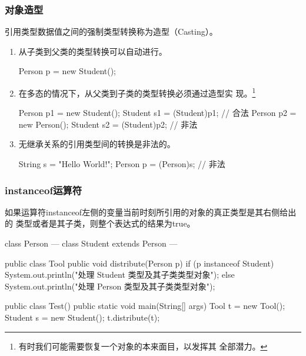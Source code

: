 \begin{frame}[fragile] %
\frametitle{对象造型}

引用类型数据值之间的强制类型转换称为{\hei\Mage 造型（Casting）}。

\begin{enumerate}[<+-| structure@+>]
\item 从子类到父类的类型转换可以自动进行。
  \begin{javaCode}
    Person p = new Student();    
  \end{javaCode}
\item 在多态的情况下，从父类到子类的类型转换必须通过造型实
  现。\footnote{{\kai 有时我们可能需要恢复一个对象的本来面目，以发挥其
      全部潜力。}}
  \begin{javaCode}
    Person p1 = new Student();  
    Student s1 = (Student)p1;   // 合法
    Person p2 = new Person();   
    Student s2 = (Student)p2;  // 非法  
  \end{javaCode}
\item 无继承关系的引用类型间的转换是非法的。
  \begin{javaCode}
    String s = "Hello World!";
    Person p = (Person)s; // 非法  
  \end{javaCode}
\end{enumerate}
\end{frame}

\begin{frame}[fragile] %
\frametitle{instanceof运算符}

{\footnotesize 如果运算符instanceof左侧的变量当前时刻所引用的对象的{\hei\Red 真正类型}是其右侧给出的
  类型{\Blue 或者是其子类}，则整个表达式的结果为true。}

\pause

\begin{javaCode}
class Person { --- }
class Student extends Person { --- }

public class Tool {
  public void distribute(Person p) {
    if (p instanceof Student) {
      System.out.println("处理 Student 类型及其子类类型对象");
    } else {
      System.out.println("处理 Person 类型及其子类类型对象");
    }
  }
}
\end{javaCode}

\begin{javaCode}
public class Test() {
  public static void main(String[] args) {
    Tool t = new Tool();
    Student s = new Student();
    t.distribute(t);
  }
}
\end{javaCode}
\end{frame}

